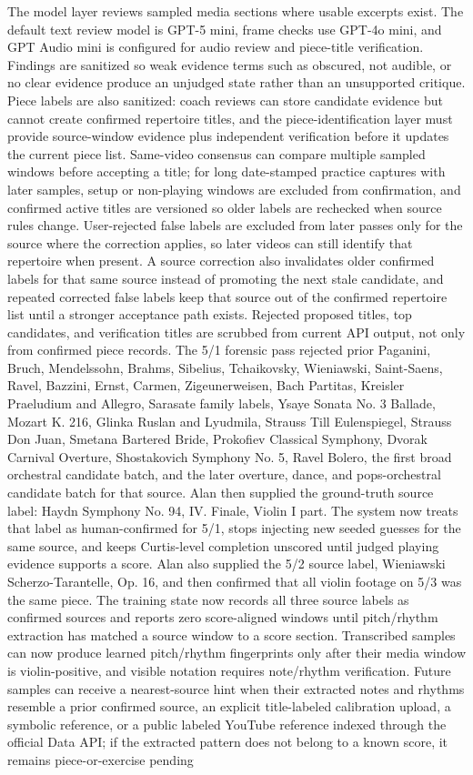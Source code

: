 \documentclass[12pt,letterpaper]{article}
\begin{document}
The model layer reviews sampled media sections where usable excerpts exist. The default text review model is GPT-5 mini, frame checks use GPT-4o mini, and GPT Audio mini is configured for audio review and piece-title verification. Findings are sanitized so weak evidence terms such as obscured, not audible, or no clear evidence produce an unjudged state rather than an unsupported critique. Piece labels are also sanitized: coach reviews can store candidate evidence but cannot create confirmed repertoire titles, and the piece-identification layer must provide source-window evidence plus independent verification before it updates the current piece list. Same-video consensus can compare multiple sampled windows before accepting a title; for long date-stamped practice captures with later samples, setup or non-playing windows are excluded from confirmation, and confirmed active titles are versioned so older labels are rechecked when source rules change. User-rejected false labels are excluded from later passes only for the source where the correction applies, so later videos can still identify that repertoire when present. A source correction also invalidates older confirmed labels for that same source instead of promoting the next stale candidate, and repeated corrected false labels keep that source out of the confirmed repertoire list until a stronger acceptance path exists. Rejected proposed titles, top candidates, and verification titles are scrubbed from current API output, not only from confirmed piece records. The 5/1 forensic pass rejected prior Paganini, Bruch, Mendelssohn, Brahms, Sibelius, Tchaikovsky, Wieniawski, Saint-Saens, Ravel, Bazzini, Ernst, Carmen, Zigeunerweisen, Bach Partitas, Kreisler Praeludium and Allegro, Sarasate family labels, Ysaye Sonata No. 3 Ballade, Mozart K. 216, Glinka Ruslan and Lyudmila, Strauss Till Eulenspiegel, Strauss Don Juan, Smetana Bartered Bride, Prokofiev Classical Symphony, Dvorak Carnival Overture, Shostakovich Symphony No. 5, Ravel Bolero, the first broad orchestral candidate batch, and the later overture, dance, and pops-orchestral candidate batch for that source. Alan then supplied the ground-truth source label: Haydn Symphony No. 94, IV. Finale, Violin I part. The system now treats that label as human-confirmed for 5/1, stops injecting new seeded guesses for the same source, and keeps Curtis-level completion unscored until judged playing evidence supports a score. Alan also supplied the 5/2 source label, Wieniawski Scherzo-Tarantelle, Op. 16, and then confirmed that all violin footage on 5/3 was the same piece. The training state now records all three source labels as confirmed sources and reports zero score-aligned windows until pitch/rhythm extraction has matched a source window to a score section. Transcribed samples can now produce learned pitch/rhythm fingerprints only after their media window is violin-positive, and visible notation requires note/rhythm verification. Future samples can receive a nearest-source hint when their extracted notes and rhythms resemble a prior confirmed source, an explicit title-labeled calibration upload, a symbolic reference, or a public labeled YouTube reference indexed through the official Data API; if the extracted pattern does not belong to a known score, it remains piece-or-exercise pending 
\end{document}
